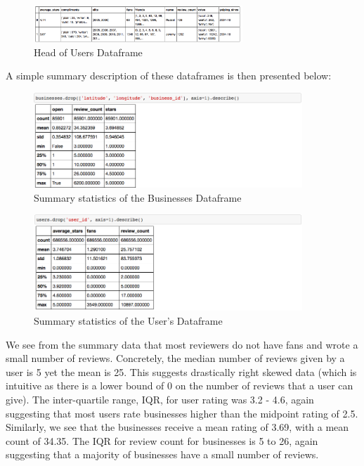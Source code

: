 \documentclass[11pt]{article}
\begin{document}
\begin{figure}[H]
\centering
\includegraphics[width=0.7\textwidth]{./ac209/user-dataframe-simplified.png}
\caption{Head of Users Dataframe}
\end{figure}

A simple summary description of these dataframes is then presented below:

\begin{figure}[H]
\centering
\includegraphics[width=0.9\textwidth]{./ac209/bizdescribe.png}
\caption{Summary statistics of the Businesses Dataframe}
\end{figure}

\begin{figure}[H]
\centering
\includegraphics[width=0.9\textwidth]{./ac209/userdescribe.png}
\caption{Summary statistics of the User's Dataframe}
\end{figure}

\par We see from the summary data that most reviewers do not have fans and wrote a small number of reviews. Concretely, the median number of reviews given by a user is 5 yet the mean is 25. This suggests drastically right skewed data (which is intuitive as there is a lower bound of 0 on the number of reviews that a user can give). The inter-quartile range, IQR, for user rating was 3.2 - 4.6, again suggesting that most users rate businesses higher than the midpoint rating of 2.5. Similarly, we see that the businesses receive a mean rating of 3.69, with a mean count of 34.35. The IQR for review count for businesses is 5 to 26, again suggesting that a majority of businesses have a small number of reviews. \\
\end{document}
